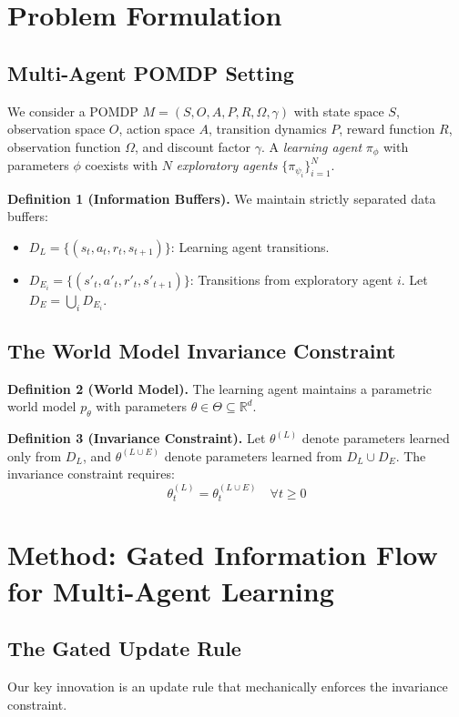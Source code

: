 \documentclass[11pt,a4paper]{article}
\begin{document}
\section{Problem Formulation}
\subsection{Multi-Agent POMDP Setting}
We consider a POMDP $M = (S, O, A, P, R, \Omega, \gamma)$ with state space $S$, observation space $O$, action space $A$, transition dynamics $P$, reward function $R$, observation function $\Omega$, and discount factor $\gamma$. A \textit{learning agent} $\pi_{\phi}$ with parameters $\phi$ coexists with $N$ \textit{exploratory agents} $\{\pi_{\psi_i}\}_{i=1}^N$.

\textbf{Definition 1 (Information Buffers).} We maintain strictly separated data buffers:
\begin{itemize}
    \item $D_L = \{(s_t, a_t, r_t, s_{t+1})\}$: Learning agent transitions.
    \item $D_{E_i} = \{(s'_t, a'_t, r'_t, s'_{t+1})\}$: Transitions from exploratory agent $i$. Let $D_E = \bigcup_i D_{E_i}$.
\end{itemize}

\subsection{The World Model Invariance Constraint}
\textbf{Definition 2 (World Model).} The learning agent maintains a parametric world model $p_{\theta}$ with parameters $\theta \in \Theta \subseteq \mathbb{R}^d$.

\textbf{Definition 3 (Invariance Constraint).} Let $\theta^{(L)}$ denote parameters learned only from $D_L$, and $\theta^{(L \cup E)}$ denote parameters learned from $D_L \cup D_E$. The invariance constraint requires:
\begin{equation}
    \theta^{(L)}_t = \theta^{(L \cup E)}_t \quad \forall t \geq 0
\end{equation}

\section{Method: Gated Information Flow for Multi-Agent Learning}
\subsection{The Gated Update Rule}
Our key innovation is an update rule that mechanically enforces the invariance constraint.
\end{document}
